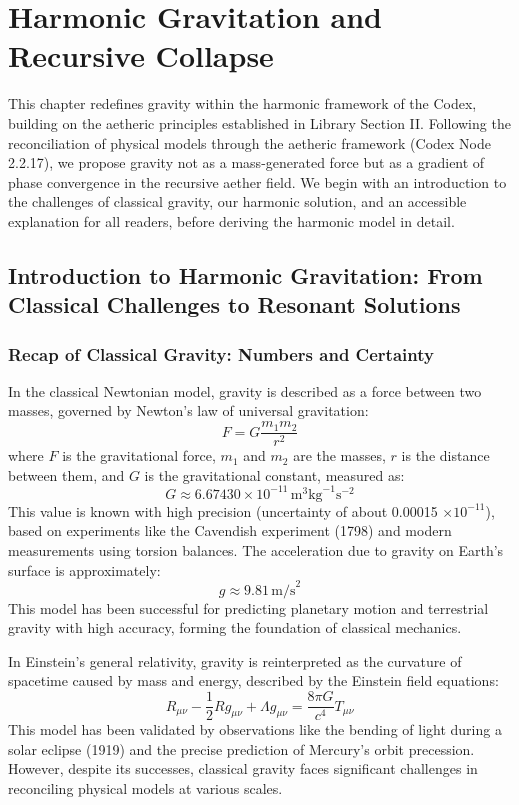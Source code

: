 
\section{Harmonic Gravitation and Recursive Collapse}
\label{sec:harmonic_gravitation}

This chapter redefines gravity within the harmonic framework of the Codex, building on the aetheric principles established in Library Section II. Following the reconciliation of physical models through the aetheric framework (Codex Node 2.2.17), we propose gravity not as a mass-generated force but as a gradient of phase convergence in the recursive aether field. We begin with an introduction to the challenges of classical gravity, our harmonic solution, and an accessible explanation for all readers, before deriving the harmonic model in detail.

\subsection{Introduction to Harmonic Gravitation: From Classical Challenges to Resonant Solutions}
\subsubsection{Recap of Classical Gravity: Numbers and Certainty}
In the classical Newtonian model, gravity is described as a force between two masses, governed by Newton’s law of universal gravitation:
\[
F = G \frac{m_1 m_2}{r^2}
\]
where \( F \) is the gravitational force, \( m_1 \) and \( m_2 \) are the masses, \( r \) is the distance between them, and \( G \) is the gravitational constant, measured as:
\[
G \approx 6.67430 \times 10^{-11} \, \text{m}^3 \text{kg}^{-1} \text{s}^{-2}
\]
This value is known with high precision (uncertainty of about 0.00015 \(\times 10^{-11}\)), based on experiments like the Cavendish experiment (1798) and modern measurements using torsion balances. The acceleration due to gravity on Earth’s surface is approximately:
\[
g \approx 9.81 \, \text{m/s}^2
\]
This model has been successful for predicting planetary motion and terrestrial gravity with high accuracy, forming the foundation of classical mechanics.

In Einstein’s general relativity, gravity is reinterpreted as the curvature of spacetime caused by mass and energy, described by the Einstein field equations:
\[
R_{\mu\nu} - \frac{1}{2} R g_{\mu\nu} + \Lambda g_{\mu\nu} = \frac{8\pi G}{c^4} T_{\mu\nu}
\]
This model has been validated by observations like the bending of light during a solar eclipse (1919) and the precise prediction of Mercury’s orbit precession. However, despite its successes, classical gravity faces significant challenges in reconciling physical models at various scales.

